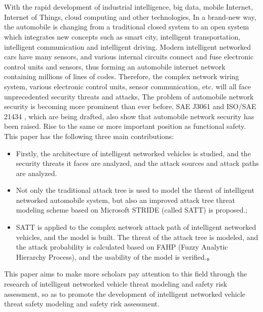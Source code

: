 \newpage
\vspace{-1cm}
\chapter*{\xiaosan {}}
\vspace{-0.5cm}
\hspace{-0.5cm}
With the rapid development of industrial intelligence, big data, mobile Internet, Internet of Things, cloud computing and other technologies,
In a brand-new way, the automobile is changing from a traditional closed system to an open system which integrates new concepts such as smart city, intelligent transportation, intelligent communication and intelligent driving.
Modern intelligent networked cars have many sensors, and various internal circuits connect and fuse electronic control units and sensors, thus forming an automobile internet network containing millions of lines of codes.
Therefore, the complex network wiring system, various electronic control units, sensor communication, etc. will all face unprecedented security threats and attacks,
The problem of automobile network security is becoming more prominent than ever before. SAE J3061 \cite{schmittner2016using} and ISO/SAE 21434 \cite{schneider2022iso}, which are being drafted, also show that automobile network security has been raised.
Rise to the same or more important position as functional safety.
This paper has the following three main contributions:
\begin{itemize}
    \item Firstly, the architecture of intelligent networked vehicles is studied, and the security threats it faces are analyzed, and the attack sources and attack paths are analyzed.
    \item Not only the traditional attack tree is used to model the threat of intelligent networked automobile system, but also an improved attack tree threat modeling scheme based on Microsoft STRIDE (called SATT) is proposed.;
    \item SATT is applied to the complex network attack path of intelligent networked vehicles, and the model is built. The threat of the attack tree is modeled, and the attack probability is calculated based on FAHP (Fuzzy Analytic Hierarchy Process), and the usability of the model is verified.。
  \end{itemize}
  This paper aims to make more scholars pay attention to this field through the research of intelligent networked vehicle threat modeling and safety risk assessment, so as to promote the development of intelligent networked vehicle threat safety modeling and safety risk assessment.

